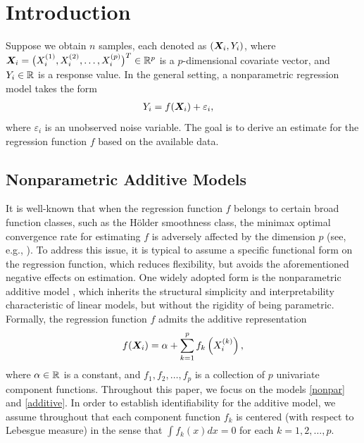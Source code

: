 \section{Introduction}

Suppose we obtain $n$ samples, each denoted as $(\bm{X}_i, Y_i)$, where  $\bm{X}_i = \big(X_i^{(1)},X_i^{(2)},\dots, X_i^{(p)}\big)^T  \in \mathbb{R}^p$ is a $p$-dimensional covariate vector, and $Y_i \in \mathbb{R}$ is a response value. In the general setting, a nonparametric regression model takes the form
\begin{equation}\label{nonpar}
\begin{aligned}
    &Y_i = f(\bm{X}_i) + \varepsilon_i,
\end{aligned}
\end{equation}
where $\varepsilon_i $ is an unobserved noise variable. The goal is to derive an estimate for the regression function $f$ based on the available data.

\subsection{Nonparametric Additive Models}
It is well-known that when the regression function $f$ belongs to certain broad function classes, such as the H\"older smoothness class, the minimax optimal convergence rate for estimating $f$ is adversely affected by the dimension $p$ (see, e.g., \cite{gyorfi2002distribution}). To address this issue, it is typical to assume a specific functional form on the regression function, which reduces flexibility, but avoids the aforementioned negative effects on estimation. One widely adopted form is the nonparametric additive model \citep{580a479e-8bd3-310b-b7a7-84887bec0fed, hastie1990generalized}, which inherits the structural simplicity and interpretability characteristic of linear models, but without the rigidity of being parametric. Formally, the regression function $f$ admits the additive representation
\begin{align}\label{additive}
    f(\bm{X}_i) = \alpha +  \sum_{k=1}^pf_k\left(X^{(k)}_i\right),
\end{align}
where $\alpha \in \mathbb{R}$ is a constant, and $f_1, f_2,\dots, f_p$ is a collection of $p$ univariate component functions. Throughout this paper, we focus on the models \eqref{nonpar} and \eqref{additive}. In order to establish identifiability for the additive model, we assume throughout that each component function $f_k $ is centered (with respect to Lebesgue measure) in the sense that $\int f_k(x) dx = 0$ for each $k=1,2,\dots,p$.

